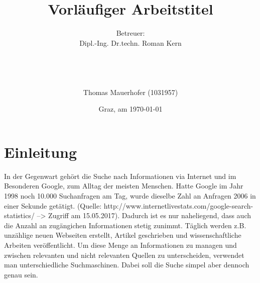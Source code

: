 \documentclass[
a4paper,     %
12pt         %
]{scrartcl}  %
\title{Vorläufiger Arbeitstitel}
\author{Betreuer: \\
Dipl.-Ing. Dr.techn. Roman Kern \\ \\ \\ \\ \\
Thomas Mauerhofer (1031957)}
\date{Graz, am \today{}}
\begin{document}

 \maketitle
 





\newpage

\tableofcontents

\newpage

\section{Einleitung}

In der Gegenwart gehört die Suche nach Informationen via Internet und im Besonderen Google, zum Alltag der meisten Menschen. Hatte Google im Jahr 1998 noch 10.000 Suchanfragen am Tag, wurde dieselbe Zahl 
an Anfragen 2006 in einer Sekunde getätigt. (Quelle: http://www.internetlivestats.com/google-search-statistics/ --> Zugriff am 15.05.2017). Dadurch ist es nur naheliegend, dass auch die Anzahl an zugängichen
Informationen stetig zunimmt. Täglich werden z.B. unzählige neuen Webseiten erstellt, Artikel geschrieben und wissenschaftliche Arbeiten veröffentlicht. Um
diese Menge an Informationen zu managen und zwischen relevanten und nicht relevanten Quellen zu unterscheiden, verwendet man unterschiedliche Suchmaschinen. 
Dabei soll die Suche simpel aber dennoch genau sein.
\end{document}
